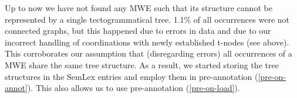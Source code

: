 \begin{itemize}
%
\end{itemize}
%
%


Up to now we have not found any MWE such that its structure cannot be represented by a single tectogrammatical tree. 1.1\% of all occurrences were not connected graphs, but this happened due to errors in data and due to our incorrect handling of coordinations with newly established t-nodes (see above). This corroborates our assumption that (disregarding errors) all occurrences of a MWE share the same tree structure. As a result, we started storing the tree structures in the SemLex entries and employ them in pre-annotation (\ref{pre-on-annot}). This also allows us to use pre-annotation (\ref{pre-on-load}).




